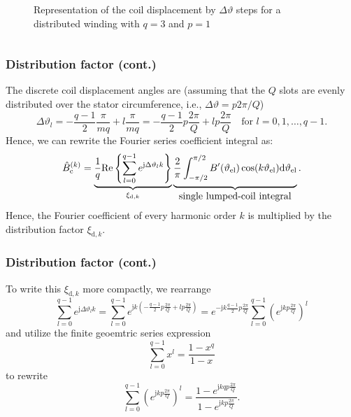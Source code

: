 \begin{frame}
\begin{columns}
\begin{column}{0.4\textwidth}
\begin{figure}
                \caption{Representation of the coil displacement by $\Delta \vartheta$ steps for a distributed winding with $q=3$ and $p=1$}
                \label{fig:MMF_single_phase_distributed}
            \end{figure}
        \end{column}
    \end{columns}
\end{frame}

\begin{frame}
	\frametitle{Distribution factor  (cont.)}
   The discrete coil displacement angles are (assuming that the $Q$ slots are evenly distributed over the stator circumference, i.e., $\Delta \vartheta = p 2  \pi/Q$)
   \begin{equation}
    \Delta\vartheta_l = -\frac{q-1}{2} \frac{\pi}{m q} + l \frac{\pi}{m q} = -\frac{q-1}{2} p \frac{2\pi}{Q} + l p \frac{2\pi}{Q} \quad \mbox{for } l=0,1,\ldots,q-1.
   \end{equation}
   Hence, we can rewrite the Fourier series coefficient integral as:
   \begin{equation}
    \hat{B}_{\mathrm{c}}^{(k)} = \underbrace{\frac{1}{q}\mathrm{Re}\left\{\sum_{l=0}^{q-1} e^{\mathrm{j} \Delta\vartheta_l k}\right\} }_{\xi_{\mathrm{d},k}} \underbrace{\frac{2}{\pi}\int_{-\pi/2}^{\pi/2} B'(\vartheta_\mathrm{el}) \cos(k \vartheta_\mathrm{el}) \mathrm{d}\vartheta_\mathrm{el} \vphantom{\sum_{l=0}^{q-1}}}_{\mbox{single lumped-coil integral}}.
\end{equation}
Hence, the Fourier coefficient of every harmonic order $k$ is multiplied by the distribution factor $\xi_{\mathrm{d},k}$. 
\end{frame}

\begin{frame}
	\frametitle{Distribution factor  (cont.)}
    To write this $\xi_{\mathrm{d},k}$ more compactly, we rearrange 
    \begin{equation}
        \sum_{l=0}^{q-1} e^{\mathrm{j} \Delta\vartheta_l k} = \sum_{l=0}^{q-1} e^{\mathrm{j} k (-\frac{q-1}{2} p \frac{2\pi}{Q} + l p \frac{2\pi}{Q})} = e^{- \mathrm{j} k \frac{q-1}{2} p \frac{2\pi}{Q}} \sum_{l=0}^{q-1} \left(e^{\mathrm{j} k  p \frac{2\pi}{Q}}\right)^l
        \label{eq:sum_exp_distribution_factor}
    \end{equation}
    and utilize the finite geoemtric series expression
    $$
    \sum_{l=0}^{q-1} x^l = \frac{1-x^q}{1-x}
    $$
    to rewrite
    $$
    \sum_{l=0}^{q-1} \left(e^{\mathrm{j} k  p \frac{2\pi}{Q}}\right)^l = \frac{1-e^{\mathrm{j} k q p \frac{2\pi}{Q}}}{1-e^{\mathrm{j} k  p \frac{2\pi}{Q}}}.
    $$
\end{frame}

